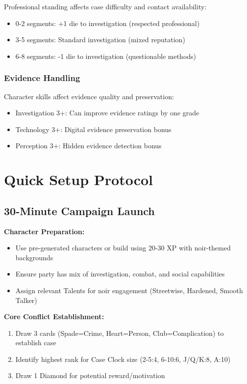 \documentclass[11pt]{article}
\begin{document}
Professional standing affects case difficulty and contact availability:
\begin{itemize}
\item 0-2 segments: +1 die to investigation (respected professional)
\item 3-5 segments: Standard investigation (mixed reputation)
\item 6-8 segments: -1 die to investigation (questionable methods)
\end{itemize}

\subsubsection{Evidence Handling}

Character skills affect evidence quality and preservation:
\begin{itemize}
\item Investigation 3+: Can improve evidence ratings by one grade
\item Technology 3+: Digital evidence preservation bonus
\item Perception 3+: Hidden evidence detection bonus
\end{itemize}

\section{Quick Setup Protocol}

\subsection{30-Minute Campaign Launch}

\textbf{Character Preparation:}
\begin{itemize}
\item Use pre-generated characters or build using 20-30 XP with noir-themed backgrounds
\item Ensure party has mix of investigation, combat, and social capabilities
\item Assign relevant Talents for noir engagement (Streetwise, Hardened, Smooth Talker)
\end{itemize}

\textbf{Core Conflict Establishment:}
\begin{enumerate}
\item Draw 3 cards (Spade=Crime, Heart=Person, Club=Complication) to establish case
\item Identify highest rank for Case Clock size (2-5:4, 6-10:6, J/Q/K:8, A:10)
\item Draw 1 Diamond for potential reward/motivation
\end{enumerate}
\end{document}
